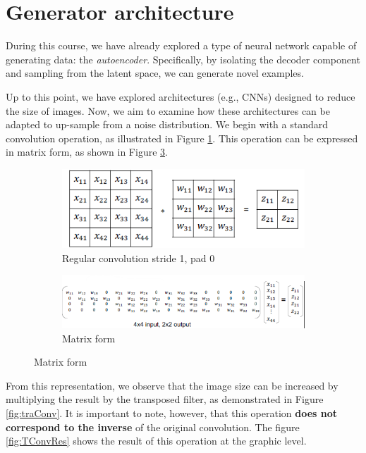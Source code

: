 \section{Generator architecture}
During this course, we have already explored a type of neural network capable of
generating data: the \textit{autoencoder}. Specifically, by isolating the decoder
component and sampling from the latent space, we can generate novel examples.

Up to this point, we have explored architectures (e.g., CNNs) designed to reduce
the size of images. Now, we aim to examine how these architectures can be adapted
to up-sample from a noise distribution. We begin with a standard convolution
operation, as illustrated in Figure \ref{fig:reg-conv}. This operation can be
expressed in matrix form, as shown in Figure \ref{fig:conmat}.

\begin{figure}[!ht]
    \centering
    \begin{subfigure}[b]{0.45\textwidth}

        \centering
        \includegraphics[width=\linewidth]{img/GAN/RegularConv.png}
        \caption{Regular convolution stride 1, pad 0}
        \label{fig:reg-conv}
    \end{subfigure}
    \hfill
    \begin{subfigure}[b]{0.45\textwidth}
        \centering
        \includegraphics[width=\linewidth]{img/GAN/matrix-vector.png}
        \caption{Matrix form}
        \label{fig:conmat}
    \end{subfigure}
\end{figure}

From this representation, we observe that the image size can be increased by
multiplying the result by the transposed filter, as demonstrated in Figure \ref{fig:traConv}.
It is important to note, however, that this operation \textbf{does not correspond
    to the inverse} of the original convolution. The figure \ref{fig:TConvRes}
shows the result of this operation at the graphic level.


